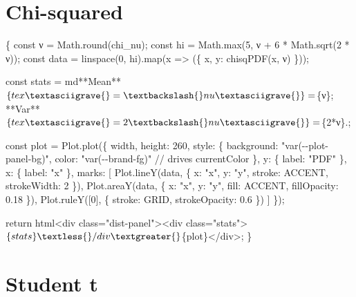 \documentclass[
  letterpaper,
  DIV=11,
  numbers=noendperiod]{scrreprt}
\newenvironment{Shaded}{\begin{snugshade}}{\end{snugshade}}
\newcommand{\NormalTok}[1]{\textcolor[rgb]{0.00,0.23,0.31}{#1}}
\theoremstyle{definition}
\theoremstyle{plain}
\theoremstyle{definition}
\theoremstyle{remark}
\begin{document}
\section{Chi-squared}

\begin{Shaded}
\begin{Highlighting}[]

\NormalTok{\{}
\NormalTok{  const ν = Math.round(chi\_nu);}
\NormalTok{  const hi = Math.max(5, ν + 6 * Math.sqrt(2 * ν));}
\NormalTok{  const data = linspace(0, hi).map(x =\textgreater{} (\{ x, y: chisqPDF(x, ν) \}));}

\NormalTok{  const stats = md\textasciigrave{}**Mean** $\{tex\textasciigrave{}= \textbackslash{}nu\textasciigrave{}\} = $\{ν\}; }
\NormalTok{  **Var** $\{tex\textasciigrave{}= 2\textbackslash{}nu\textasciigrave{}\} = $\{2*ν\}.\textasciigrave{};}

\NormalTok{  const plot = Plot.plot(\{}
\NormalTok{        width, height: 260,}
\NormalTok{    style: \{}
\NormalTok{    background: "var({-}{-}plot{-}panel{-}bg)",}
\NormalTok{    color: "var({-}{-}brand{-}fg)"           // drives \textquotesingle{}currentColor\textquotesingle{}}
\NormalTok{    \},}
\NormalTok{ y: \{ label: "PDF" \}, x: \{ label: "x" \},}
\NormalTok{    marks: [}
\NormalTok{      Plot.lineY(data, \{ x: "x", y: "y", stroke: ACCENT, strokeWidth: 2 \}),}
\NormalTok{      Plot.areaY(data, \{ x: "x", y: "y", fill: ACCENT, fillOpacity: 0.18 \}),}
\NormalTok{      Plot.ruleY([0], \{ stroke: GRID, strokeOpacity: 0.6 \})}
\NormalTok{    ]}
\NormalTok{  \});}

\NormalTok{  return html\textasciigrave{}\textless{}div class="dist{-}panel"\textgreater{}\textless{}div class="stats"\textgreater{}$\{stats\}\textless{}/div\textgreater{}$\{plot\}\textless{}/div\textgreater{}\textasciigrave{};}
\NormalTok{\}}
\end{Highlighting}
\end{Shaded}

\begin{Shaded}
\end{Shaded}

\section{Student t}
\end{document}
